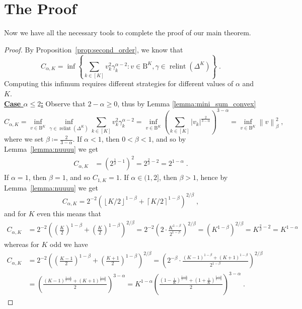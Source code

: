 \documentclass[11pt,oneside,a4paper]{article}
\newcommand{\lrb}[1]{\left(#1\right)}
\newcommand{\lcb}[1]{\left\{#1\right\}}
\newcommand{\lno}[1]{\left\lVert#1\right\rVert}
\newcommand{\fracc}[2]{#1/#2}
\theoremstyle{plain}
\theoremstyle{definition}
\theoremstyle{remark}
\newcommand{\simplex}[1]{\Delta^{#1}}
\DeclareMathOperator*{\relint}{relint}
\newcommand{\tsphere}[1]{\mathrm{B}^{#1}}
\newcommand{\mycase}[1]{\underline{\textbf{Case #1:}}}
\begin{document}
\section{The Proof}
Now we have all the necessary tools to complete the proof of our main theorem.
{\renewcommand{\proofname}{Proof of Theorem~\ref{thm:pinsker}}
\begin{proof}
By Proposition~\ref{prop:second_order}, we know that 
\[
    C_{\alpha, K}
=
    \inf \lcb{ \sum_{k \in [K]} v_k^2 \gamma_k^{\alpha -2} : v \in \tsphere{K}, \gamma \in \relint\lrb{\simplex{K}}}\;.
\]  
Computing this infimum requires different strategies for different values of $\alpha$ and $K$.
\\
\mycase{$\alpha \le 2$}
Observe that $2 -\alpha  \ge 0$, thus by Lemma \ref{lemma:mini_sum_convex}
\[
    C_{\alpha, K}
=
    \inf_{v \in \tsphere{K}}
    \inf_{\gamma \in \relint\lrb{\simplex{K}}}
    \sum_{k \in [K]} v_k^2 \gamma_k^{\alpha -2}
=
    \inf_{v \in \tsphere{K}} \lrb{\sum_{k \in [K]} |v_k|^{\frac{2}{3 -\alpha}} }^{3-\alpha}
=
    \inf_{v \in \tsphere{K}} \lno{v}_{\beta}^2 \;,
\]
where we set $\beta \coloneq \frac{2}{3 - \alpha}$.
If $\alpha < 1$, then $0 < \beta < 1$, and so by Lemma~\ref{lemma:nuuuu} we get
\begin{align*}
    C_{\alpha, K}
&=
     \lrb{2^{\frac{1}{\beta} - 1}}^{ 2}
= 
     {2}^{ \frac{2}{\beta} - 2}
= 
     {2}^{ 1 - \alpha}\;.
\end{align*}
If $\alpha =1$, then $\beta = 1$, and so $C_{1, K} = 1$.
If $\alpha \in (1,2]$, then $\beta > 1$, hence by Lemma~\ref{lemma:nuuuu} we get
\[
    C_{\alpha, K}
=
     2^{-2} \lrb{{\left\lfloor \fracc{K}{2} \right\rfloor}^{1 - \beta} +  {\left\lceil \fracc{K}{2} \right\rceil}^{1 - \beta}}^{2/\beta}\;,
\]
and for $K$ even this means that
\begin{align*}
    C_{\alpha, K}
&= 
     2^{-2} \lrb{\lrb{\frac{K}{2}}^{1 - \beta} +  \lrb{\frac{K}{2}}^{1 - \beta}}^{2/\beta}
= 
    2^{-2} \lrb{ 2 \cdot \frac{{K}^{1 - \beta}}{2^{1 - \beta}} }^{2/\beta}
= 
    \lrb{{K}^{1 - \beta}}^{2/\beta}
= 
    {K}^{ \frac{2}{\beta} - 2}
=
    {K}^{ 1 - \alpha}
\end{align*}
whereas for $K$ odd we have 
\begin{align*}
    C_{\alpha, K}
&= 
     2^{-2} \lrb{\lrb{\frac{K-1}{2}}^{1 - \beta} +  \lrb{\frac{K+1}{2}}^{1 - \beta}}^{2/\beta}
= 
     \lrb{  2^{- \beta} \cdot \frac{ (K-1)^{1 - \beta} + (K+1)^{1 - \beta} }{2^{1 - \beta} } }^{2/\beta}
\\
&= 
     \lrb{  \frac{ (K-1)^{\frac{1 - \alpha}{3- \alpha}} + (K+1)^{\frac{1 - \alpha}{3- \alpha}} }{2} }^{3 - \alpha}
= 
     {K}^{ 1 - \alpha}
    \lrb{  \frac{ (1-\frac{1}{K})^{\frac{1 - \alpha}{3- \alpha}} + (1+\frac{1}{K})^{\frac{1 - \alpha}{3- \alpha}} }{2} }^{3 - \alpha}\;.
\end{align*}


\end{proof}}
\end{document}
